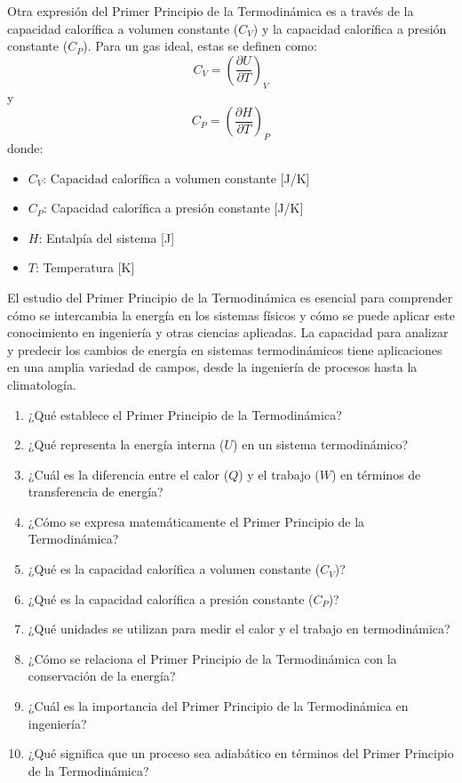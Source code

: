 \documentclass[../main]{subfiles}
\begin{document}
Otra expresión del Primer Principio de la Termodinámica es a través de la capacidad calorífica a volumen constante ($C_V$) y la capacidad calorífica a presión constante ($C_P$). Para un gas ideal, estas se definen como:
\begin{equation}
C_V = \left( \frac{\partial U}{\partial T} \right)_V
\end{equation}
y
\begin{equation}
C_P = \left( \frac{\partial H}{\partial T} \right)_P
\end{equation}
donde:
\begin{itemize}
    \item $C_V$: Capacidad calorífica a volumen constante [J/K]
    \item $C_P$: Capacidad calorífica a presión constante [J/K]
    \item $H$: Entalpía del sistema [J]
    \item $T$: Temperatura [K]
\end{itemize}

El estudio del Primer Principio de la Termodinámica es esencial para comprender cómo se intercambia la energía en los sistemas físicos y cómo se puede aplicar este conocimiento en ingeniería y otras ciencias aplicadas. La capacidad para analizar y predecir los cambios de energía en sistemas termodinámicos tiene aplicaciones en una amplia variedad de campos, desde la ingeniería de procesos hasta la climatología.

\begin{enumerate}
    \item ¿Qué establece el Primer Principio de la Termodinámica?
    \item ¿Qué representa la energía interna ($U$) en un sistema termodinámico?
    \item ¿Cuál es la diferencia entre el calor ($Q$) y el trabajo ($W$) en términos de transferencia de energía?
    \item ¿Cómo se expresa matemáticamente el Primer Principio de la Termodinámica?
    \item ¿Qué es la capacidad calorífica a volumen constante ($C_V$)?
    \item ¿Qué es la capacidad calorífica a presión constante ($C_P$)?
    \item ¿Qué unidades se utilizan para medir el calor y el trabajo en termodinámica?
    \item ¿Cómo se relaciona el Primer Principio de la Termodinámica con la conservación de la energía?
    \item ¿Cuál es la importancia del Primer Principio de la Termodinámica en ingeniería?
    \item ¿Qué significa que un proceso sea adiabático en términos del Primer Principio de la Termodinámica?

\end{enumerate}
\end{document}
